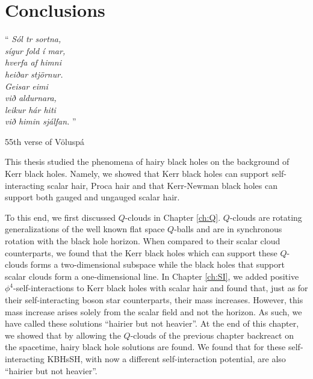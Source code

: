 \chapter{Conclusions}
\label{ch:conclusions}

\epigraph{``\emph{
Sól tr sortna, \\
sígur fold í mar, \\
hverfa af himni \\
heiðar stjörnur. \\
Geisar eimi \\
við aldurnara, \\
leikur hár hiti \\
við himin sjálfan. 
} 
''}{55th verse of Völuspá}


This thesis studied the phenomena of hairy black holes on the background of Kerr black holes.
Namely, we showed that Kerr black holes can support self-interacting scalar hair, Proca hair and that Kerr-Newman black holes can support both gauged and ungauged scalar hair.

To this end, we first discussed $Q$-clouds in Chapter \ref{ch:Q}.
$Q$-clouds are rotating generalizations of the well known flat space $Q$-balls and are in synchronous rotation with the black hole horizon.
When compared to their scalar cloud counterparts, we found that the Kerr black holes which can support these $Q$-clouds forms a two-dimensional subspace while the black holes that support scalar clouds form a one-dimensional line.
In Chapter \ref{ch:SI}, we added positive $\phi^4$-self-interactions to Kerr black holes with scalar hair and found that, just as for their self-interacting boson star counterparts, their mass increases.
However, this mass increase arises solely from the scalar field and not the horizon.
As such, we have called these solutions ``hairier but not heavier''.
At the end of this chapter, we showed that by allowing the $Q$-clouds of the previous chapter backreact on the spacetime, hairy black hole solutions are found.
We found that for these self-interacting KBHsSH, with now a different self-interaction potential, are also ``hairier but not heavier''.

\bigskip

